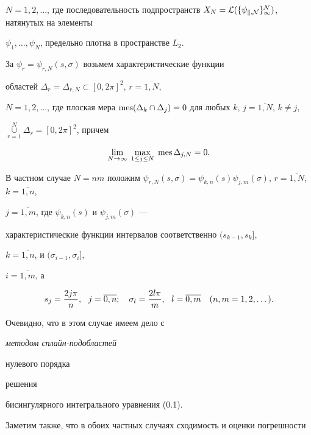 $N=1,2,\dotsc$, где последовательность подпространств $X_N =


\rL(\{\psi_{k,N}\}_1^N)$, натянутых на элементы


$\psi_1,\dotsc,\psi_N$, предельно плотна в пространстве $L_2$.


За $\psi_r=\psi_{r,N}(s,\sigma)$ возьмем характеристические функции


областей $\Delta_r=\Delta_{r,N}\subset [0,2\pi]^2$, $r=\overline{1,N}$,


$N=1,2,\dotsc$, где плоская мера $\mes (\Delta_k\cap


\Delta_j)=0$ для любых $k$, $j=\overline{1,N}$, $k\ne j$,


$\mathop{\cup}\limits_{r=1}^N


\Delta_r=[0,2\pi ]^2$, причем


$$


\lim_{N\rightarrow \infty }\; \max_{1\leq j\leq N}\; \mes \Delta


_{j,N}=0.


$$


В частном случае $N=nm$ положим $\psi_{r,N}(s,\sigma )=


\psi_{k,n}(s)\psi_{j,m}(\sigma )$, $r=\overline{1,N}$, $k=\overline{1,n}$,


$j=\overline{1,m}$, где $\psi_{k,n}(s)$ и $\psi_{j,m}(\sigma )$ ---


характеристические функции интервалов соответственно $(s_{k-1},s_k]$,


$k=\overline{1,n}$, и $( \sigma _{i-1},\sigma _i]$, 


$i=\overline{1,m}$, а


\begin{equation}


s_j=\frac{2j\pi}{n},\ \ j=\ol{0,n};\quad \sigma _l=\frac{2l\pi}{m},


\ \ l=\ol{0,m}\quad


(n,m=1,2,\dotsc).


\end{equation}


Очевидно, что в этом случае имеем дело с {\it методом сплайн-подобластей 


нулевого порядка} решения


бисингулярного интегрального уравнения (0.1).





Заметим также, что в обоих частных случаях сходимость и оценки погрешности


